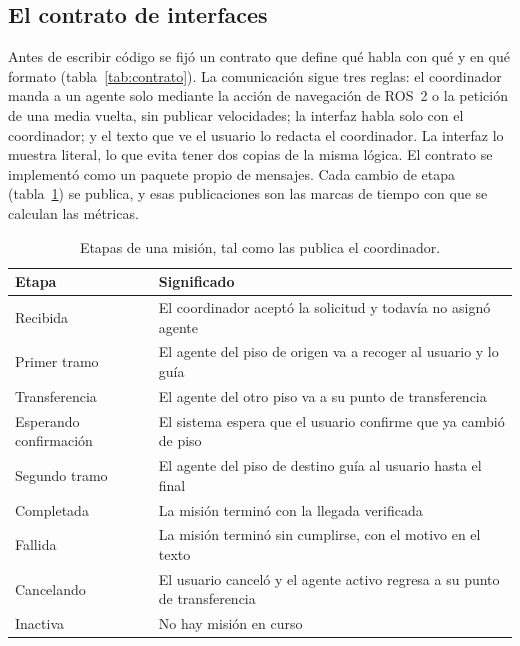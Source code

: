 \subsection{El contrato de interfaces}
\label{sec:contrato}

Antes de escribir código se fijó un contrato que define qué habla con qué y en qué formato (tabla~\ref{tab:contrato}). La comunicación sigue tres reglas: el coordinador manda a un agente solo mediante la acción de navegación de ROS~2 o la petición de una media vuelta, sin publicar velocidades; la interfaz habla solo con el coordinador; y el texto que ve el usuario lo redacta el coordinador. La interfaz lo muestra literal, lo que evita tener dos copias de la misma lógica. El contrato se implementó como un paquete propio de mensajes. Cada cambio de etapa (tabla~\ref{tab:etapas-mision}) se publica, y esas publicaciones son las marcas de tiempo con que se calculan las métricas.

\begin{table}[H]
  \centering\footnotesize
  \caption{Etapas de una misión, tal como las publica el coordinador.}
  \label{tab:etapas-mision}
  \begin{tabular}{@{}p{}p{}@{}}
    \toprule
    \textbf{Etapa} & \textbf{Significado} \\ \midrule
    Recibida & El coordinador aceptó la solicitud y todavía no asignó agente \\
    Primer tramo & El agente del piso de origen va a recoger al usuario y lo guía \\
    Transferencia & El agente del otro piso va a su punto de transferencia \\
    Esperando confirmación & El sistema espera que el usuario confirme que ya cambió de piso \\
    Segundo tramo & El agente del piso de destino guía al usuario hasta el final \\
    Completada & La misión terminó con la llegada verificada \\
    Fallida & La misión terminó sin cumplirse, con el motivo en el texto \\
    Cancelando & El usuario canceló y el agente activo regresa a su punto de transferencia \\
    Inactiva & No hay misión en curso \\ \bottomrule
  \end{tabular}
\end{table}


